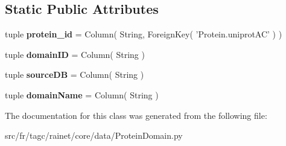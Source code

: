 \subsection*{Static Public Attributes}
\begin{DoxyCompactItemize}
\item 
\hypertarget{classsrc_1_1fr_1_1tagc_1_1rainet_1_1core_1_1data_1_1ProteinDomain_1_1ProteinDomain_a948742735bf7249f914dce36ffebc19b}{tuple {\bfseries protein\-\_\-id} = Column( String, Foreign\-Key( 'Protein.\-uniprot\-A\-C' ) )}\label{classsrc_1_1fr_1_1tagc_1_1rainet_1_1core_1_1data_1_1ProteinDomain_1_1ProteinDomain_a948742735bf7249f914dce36ffebc19b}

\item 
\hypertarget{classsrc_1_1fr_1_1tagc_1_1rainet_1_1core_1_1data_1_1ProteinDomain_1_1ProteinDomain_a6cf5c6f05f152f3de54ceca5ada1676d}{tuple {\bfseries domain\-I\-D} = Column( String )}\label{classsrc_1_1fr_1_1tagc_1_1rainet_1_1core_1_1data_1_1ProteinDomain_1_1ProteinDomain_a6cf5c6f05f152f3de54ceca5ada1676d}

\item 
\hypertarget{classsrc_1_1fr_1_1tagc_1_1rainet_1_1core_1_1data_1_1ProteinDomain_1_1ProteinDomain_a3485fa86df595e8f3aaa14352fe45e21}{tuple {\bfseries source\-D\-B} = Column( String )}\label{classsrc_1_1fr_1_1tagc_1_1rainet_1_1core_1_1data_1_1ProteinDomain_1_1ProteinDomain_a3485fa86df595e8f3aaa14352fe45e21}

\item 
\hypertarget{classsrc_1_1fr_1_1tagc_1_1rainet_1_1core_1_1data_1_1ProteinDomain_1_1ProteinDomain_ad5b09730ef6de986e37651221da55f4e}{tuple {\bfseries domain\-Name} = Column( String )}\label{classsrc_1_1fr_1_1tagc_1_1rainet_1_1core_1_1data_1_1ProteinDomain_1_1ProteinDomain_ad5b09730ef6de986e37651221da55f4e}

\end{DoxyCompactItemize}


The documentation for this class was generated from the following file\-:\begin{DoxyCompactItemize}
\item 
src/fr/tagc/rainet/core/data/Protein\-Domain.\-py\end{DoxyCompactItemize}
